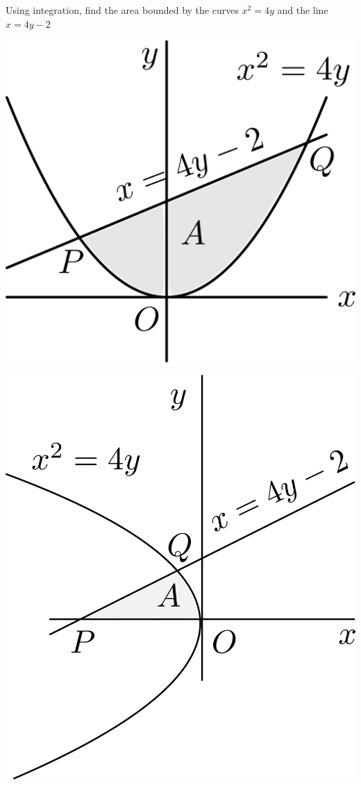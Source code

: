 \documentclass[14pt,fleqn]{extarticle}
\begin{document}
Using integration, find the area bounded by
the curves $x^2 = 4y$ and the line $x = 4y-2$
%

\newcard

\begin{center}
\includegraphics[scale=0.3]{img_right.svg} 
\end{center} 

\newcard

\begin{center}
\includegraphics[scale=0.3]{img_wrong.svg} 
\end{center} 
\end{document}

